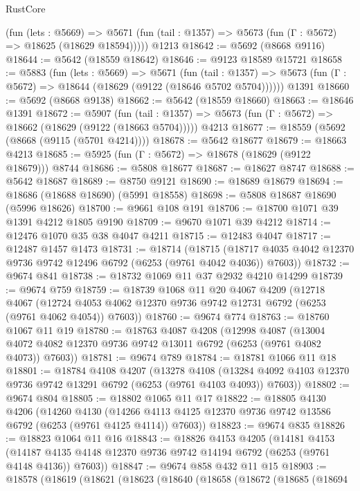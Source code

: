 \begin{lexlean}{RustCore}
\begin{coremodule}
      (fun (lets : @5669) =>
      @5671 (fun (tail : @1357) => @5673 (fun (Γ : @5672) => @18625 (@18629 @18594)))))
    @1213
@18642 := @5692 (@8668 @9116)
@18644 := @5642 (@18559 @18642)
@18646 := @9123 @18589 @15721
@18658 := @5883
    (fun (lets : @5669) =>
    @5671
      (fun (tail : @1357) =>
      @5673 (fun (Γ : @5672) => @18644 (@18629 (@9122 (@18646 @5702 @5704))))))
    @1391
@18660 := @5692 (@8668 @9138)
@18662 := @5642 (@18559 @18660)
@18663 := @18646 @1391
@18672 := @5907
    (fun (tail : @1357) => @5673 (fun (Γ : @5672) => @18662 (@18629 (@9122 (@18663 @5704)))))
    @4213
@18677 := @18559 (@5692 (@8668 (@9115 (@5701 @4214))))
@18678 := @5642 @18677
@18679 := @18663 @4213
@18685 := @5925 (fun (Γ : @5672) => @18678 (@18629 (@9122 @18679))) @8744
@18686 := @5808 @18677
@18687 := @18627 @8747
@18688 := @5642 @18687
@18689 := @8750 @9121
@18690 := @18689 @18679
@18694 := @18686 (@18688 @18690) (@5991 @18558)
@18698 := @5808 @18687 @18690 (@5996 @18626)
@18700 := @9661 @108 @191
@18706 := @18700 @1071 @39 @1391 @4212 @1805 @9190
@18709 := @9670 @1071 @39 @4212
@18714 := @12476 @1070 @35 @38 @4047 @4211
@18715 := @12483 @4047
@18717 := @12487 @1457 @1473
@18731 := @18714
    (@18715 (@18717 @4035 @4042 @12370 @9736 @9742 @12496 @6792 (@6253 (@9761 @4042 @4036)) @7603))
@18732 := @9674 @841
@18738 := @18732 @1069 @11 @37 @2932 @4210 @14299
@18739 := @9674 @759
@18759 := @18739
    @1068
    @11
    @20
    @4067
    @4209
    (@12718
      @4067
      (@12724 @4053 @4062 @12370 @9736 @9742 @12731 @6792 (@6253 (@9761 @4062 @4054)) @7603))
@18760 := @9674 @774
@18763 := @18760 @1067 @11 @19
@18780 := @18763
    @4087
    @4208
    (@12998
      @4087
      (@13004 @4072 @4082 @12370 @9736 @9742 @13011 @6792 (@6253 (@9761 @4082 @4073)) @7603))
@18781 := @9674 @789
@18784 := @18781 @1066 @11 @18
@18801 := @18784
    @4108
    @4207
    (@13278
      @4108
      (@13284 @4092 @4103 @12370 @9736 @9742 @13291 @6792 (@6253 (@9761 @4103 @4093)) @7603))
@18802 := @9674 @804
@18805 := @18802 @1065 @11 @17
@18822 := @18805
    @4130
    @4206
    (@14260
      @4130
      (@14266 @4113 @4125 @12370 @9736 @9742 @13586 @6792 (@6253 (@9761 @4125 @4114)) @7603))
@18823 := @9674 @835
@18826 := @18823 @1064 @11 @16
@18843 := @18826
    @4153
    @4205
    (@14181
      @4153
      (@14187 @4135 @4148 @12370 @9736 @9742 @14194 @6792 (@6253 (@9761 @4148 @4136)) @7603))
@18847 := @9674 @858 @432 @11 @15
@18903 := @18578
    (@18619
      (@18621
        (@18623
          (@18640
            (@18658
              (@18672
                (@18685
                  (@18694

\end{coremodule}
\end{lexlean}
